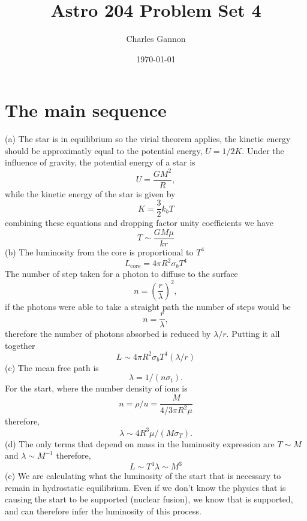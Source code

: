 \documentclass[11pt]{article}
\author{Charles Gannon}
\date{\today}
\title{Astro 204 Problem Set 4}
\begin{document}
\maketitle
\tableofcontents

\section{The main sequence}
\label{sec:org9a11cb4}
(a) The star is in equilibrium so the virial theorem applies, the kinetic energy should be approximatly equal to the potential energy,
\(U = 1/2 K\).
Under the influence of gravity, the potential energy of a star is
\begin{equation}
 U = \frac{G M^2}{R},
\end{equation}
while the kinetic energy of the star is given by
\begin{equation}
 K = \frac{3}{2} k_b T
\end{equation}
combining these equations and dropping factor unity coefficients we have
\begin{equation}
 T \sim \frac{G M \mu}{kr}
\end{equation}
(b) The luminosity from the core is proportional to \(T^4\)
\begin{equation}
 L_{\text{core}} = 4 \pi R^2 \sigma_b T^4
\end{equation}
The number of step taken for a photon to diffuse to the surface
\begin{equation}
 n = \left ( \frac{r}{\lambda} \right )^2,
\end{equation}
if the photons were able to take a straight path the number of steps would be
\begin{equation}
 n = \frac{r}{\lambda},
\end{equation}
therefore the number of photons absorbed is reduced by \(\lambda / r\).
Putting it all together
\begin{equation}
  L \sim 4 \pi R^2 \sigma_b T^4 \left( \lambda / r \right)
\end{equation}
(c) The mean free path is
\begin{equation}
 \lambda = 1 / (n \sigma_t).
\end{equation}
For the start, where the number density of ions is
\begin{equation}
 n = \rho / u = \frac{M}{4/3 \pi R^2 \mu}
\end{equation}
therefore,
\begin{equation}
 \lambda \sim 4 R^3 \mu / (M \sigma_T).
\end{equation}
(d) The only terms that depend on mass in the luminosity expression are \(T \sim M\) and \(\lambda \sim M^{-1}\) therefore,
\begin{equation}
 L \sim T^4 \lambda \sim M^{3}
\end{equation}
(e) We are calculating what the luminosity of the start that is necessary to remain in hydrostatic equilibrium.
Even if we don't know the physics that is causing the start to be supported (nuclear fusion), we know that is supported, and can therefore infer the luminosity of this process.
\end{document}
